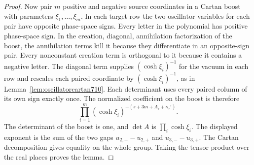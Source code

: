 \documentclass[a4paper,11pt]{article}
\theoremstyle{definition}
\theoremstyle{remark}
\numberwithin{equation}{section}
\begin{document}
\begin{proof}
Now pair \(m\) positive and negative source coordinates in
a Cartan boost with parameters \(\xi_1,\ldots,\xi_m\).
In each target row the two oscillator variables for each
pair have opposite phase-space signs. Every letter in the
polynomial has positive phase-space sign. In the creation,
diagonal, annihilation factorization of the boost, the
annihilation terms kill it because they differentiate in
an opposite-sign pair. Every nonconstant creation term is
orthogonal to it because it contains a negative letter.
The diagonal term supplies \((\cosh\xi_i)^{-1}\) for the
vacuum in each row and rescales each paired coordinate by
\((\cosh\xi_i)^{-1}\), as in Lemma~\ref{lem:oscillatorcartan710}.
Each determinant uses every paired column of its own sign
exactly once. The normalized coefficient on the boost is
therefore
\[
       \prod_{i=1}^{m}(\cosh\xi_i)^{-(s+3m+A_\tau+\kappa_\tau')}.
\]
The determinant of the boost is one, and \(\det A\) is
\(\prod_i\cosh\xi_i\). The displayed exponent is the sum
of the two gaps \(u_{2,-}-u_{2,+}\) and \(u_{3,-}-u_{3,+}\).
The Cartan decomposition gives equality on the whole group.
Taking the tensor product over the real places proves the lemma.
\end{proof}
\end{document}
